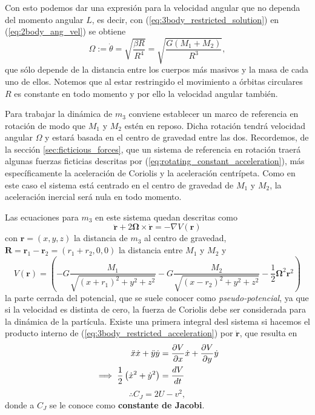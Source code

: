 Con esto podemos dar una expresión para la velocidad angular que no dependa del momento angular $L$, es decir, con (\ref{eq:3body_restricted_solution}) en (\ref{eq:2body_ang_vel}) se obtiene
\begin{equation}
 \Omega := \dot{\theta} = \sqrt{ \frac{\beta R}{R^4} } = \sqrt{\frac{G \left(M_1 + M_2 \right)}{R^3}},
 \label{eq:3body_ang_velocity}
\end{equation}
que sólo depende de la distancia entre los cuerpos más masivos y la masa de cada uno de ellos. Notemos que al estar restringido el movimiento a órbitas circulares $R$ es constante en todo momento y por ello la velocidad angular también.

Para trabajar la dinámica de $m_3$ conviene establecer un marco de referencia en rotación de modo que $M_1$ y $M_2$ estén en reposo. Dicha rotación tendrá velocidad angular $\Omega$ y estará basada en el centro de gravedad entre las dos. Recordemos, de la sección \ref{sec:ficticious_forces}, que un sistema de referencia en rotación traerá algunas fuerzas ficticias descritas por (\ref{eq:rotating_constant_acceleration}), más específicamente la aceleración de Coriolis y la aceleración centrípeta. Como en este caso el sistema está centrado en el centro de gravedad de $M_1$ y $M_2$, la aceleración inercial será nula en todo momento.

Las ecuaciones para $m_3$ en este sistema quedan descritas como
\begin{equation}
 \ddot{\mathbf{r}} + 2\mathbf{\Omega} \times \dot{\mathbf{r}} = - \nabla V(\mathbf{r})
 \label{eq:3body_restricted_acceleration}
\end{equation}
con $\mathbf{r} = (x,y,z)$ la distancia de $m_3$ al centro de gravedad, $\mathbf{R} = \mathbf{r}_1 - \mathbf{r}_2 = (r_1 + r_2,0,0)$ la distancia entre $M_1$ y $M_2$ y
\begin{equation}
 V(\mathbf{r}) = \left( -G \frac{M_1}{\sqrt{(x + r_1)^2 + y^2 + z^2}} - G \frac{M_2}{\sqrt{(x - r_2)^2 + y^2 + z^2}} - \frac{1}{2} \mathbf{\Omega}^2 \mathbf{r}^2 \right)
 \label{eq:3body_restricted_potential}
\end{equation} 
la parte cerrada del potencial, que se suele conocer como \textit{pseudo-potencial}, ya que si la velocidad es distinta de cero, la fuerza de Coriolis debe ser considerada para la dinámica de la partícula.
Existe una primera integral desl sistema si hacemos el producto interno de (\ref{eq:3body_restricted_acceleration}) por $\dot{\mathbf{r}}$, que resulta en 
\begin{align*}
 \ddot{x} \dot{x} + \ddot{y} \dot{y} &= \frac{\partial V}{\partial x}\dot{x} + \frac{\partial V}{\partial y} \dot{y} \\
 \implies \frac{1}{2} \left( \dot{x}^2 + \dot{y}^2 \right) &= \frac{d V}{dt} 
\end{align*}
\begin{equation}
 \therefore C_J = 2U - v^2,
 \label{eq:3body_jacobi_constant}
\end{equation}
donde a $C_J$ se le conoce como \textbf{constante de Jacobi}.

